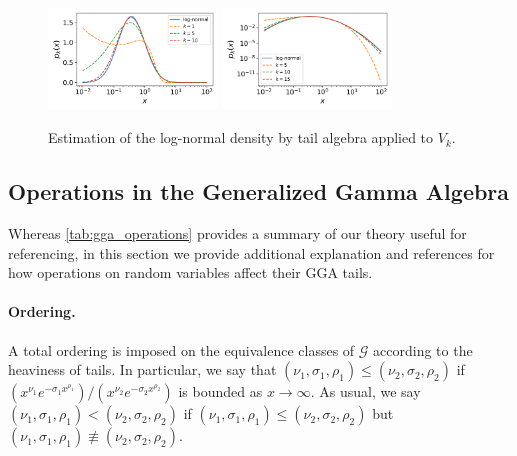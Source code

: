 \documentclass[../thesis.tex]{subfiles}
\begin{document}
\begin{figure}[h]
  \centering
  \includegraphics[width=0.4\textwidth]{figures/LogNormal_Bulk.png}
  \includegraphics[width=0.4\textwidth]{figures/LogNormal_Tail.png}
  \caption{Estimation of the log-normal density by tail algebra applied to $V_k$.}
  \label{fig:lognormal}
\end{figure}

\subsection{Operations in the Generalized Gamma Algebra}

Whereas \cref{tab:gga_operations} provides a summary of our theory useful
for referencing, in this section we provide additional explanation and references
for how operations on random variables affect their GGA tails.

\paragraph{Ordering.} A total ordering is imposed on the equivalence classes of $\mathcal{G}$ according to the heaviness of tails. In particular, we say that $(\nu_1,\sigma_1,\rho_1) \leq (\nu_2,\sigma_2,\rho_2)$ if $(x^{\nu_1} e^{-\sigma_1 x^{\rho_1}}) / (x^{\nu_2} e^{-\sigma_2 x^{\rho_2}})$ is bounded as $x \to \infty$. As usual, we say $(\nu_1,\sigma_1,\rho_1) < (\nu_2,\sigma_2,\rho_2)$ if $(\nu_1,\sigma_1,\rho_1) \leq (\nu_2,\sigma_2,\rho_2)$ but $(\nu_1,\sigma_1,\rho_1) \not\equiv (\nu_2,\sigma_2,\rho_2)$.

\end{document}
